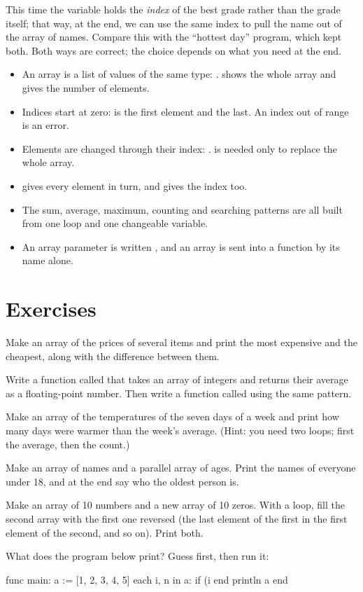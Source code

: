 This time the variable  holds the \emph{index} of the best grade
rather than the grade itself; that way, at the end, we can use the same
index to pull the name out of the array of names. Compare this with the
``hottest day'' program, which kept both. Both ways are correct; the choice
depends on what you need at the end.

\begin{summary}
\begin{itemize}
  \item An array is a list of values of the same type:
        .  shows the whole
        array and  gives the number of elements.
  \item Indices start at zero:  is the first element and
         the last. An index out of range is an error.
  \item Elements are changed through their index: .
         is needed only to replace the whole array.
  \item {} gives every element in turn, and
         gives the index too.
  \item The sum, average, maximum, counting and searching patterns are all
        built from one loop and one changeable variable.
  \item An array parameter is written , and an array is sent
        into a function by its name alone.
\end{itemize}
\end{summary}

\section*{Exercises}

\exercise Make an array of the prices of several items and print the most
expensive and the cheapest, along with the difference between them.

\exercise Write a function called  that takes an array of
integers and returns their average as a floating-point number. Then write a
function called  using the same pattern.

\exercise Make an array of the temperatures of the seven days of a week and
print how many days were warmer than the week's average. (Hint: you need
two loops; first the average, then the count.)

\exercise Make an array of names and a parallel array of ages. Print the
names of everyone under 18, and at the end say who the oldest person is.

\exercise Make an array of 10 numbers and a new array of 10 zeros. With a
loop, fill the second array with the first one reversed (the last element of
the first in the first element of the second, and so on). Print both.

\exercise What does the program below print? Guess first, then run it:
\begin{salamcode}
func main:
    a := [1, 2, 3, 4, 5]
    each i, n in a:
        if (i %
    end
    println a
end
\end{salamcode}
